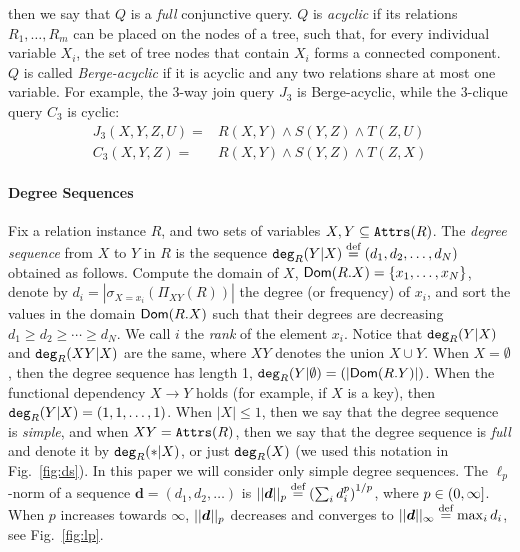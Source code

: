 then we say that $Q$ is a \emph{full} conjunctive
query.  $Q$ is \emph{acyclic} if its relations $R_1, \ldots, R_m$ can
be placed on the nodes of a tree, such that, for every individual
variable $X_i$, the set of tree nodes that contain $X_i$ forms a
connected component.  $Q$ is called \emph{Berge-acyclic} if it is
acyclic and any two relations share at most one variable.  For
example, the 3-way join query $J_3$ is Berge-acyclic, while the
3-clique query $C_3$ is cyclic:
%
\begin{align}
  J_3(X,Y,Z,U) = & R(X,Y) \wedge S(Y,Z) \wedge T(Z, U) \label{eq:j3}\\
  C_3(X,Y,Z)   = & R(X,Y) \wedge S(Y,Z) \wedge T(Z,X) \label{eq:c3}
\end{align}
%

\paragraph{Degree Sequences}
Fix a relation instance $R$, and two
sets of variables $X, Y \subseteq \texttt{Attrs}(R)$.  The \emph{degree
  sequence} from $X$ to $Y$ in $R$ is the sequence
$\texttt{deg}_R(Y|X) \stackrel{\text{def}}{=} (d_1, d_2, \ldots, d_N)$ obtained as follows.
Compute the domain of $X$, $\textsf{Dom}(R.X)=\{x_1, \ldots, x_N\}$, denote
by $d_i = |\sigma_{X=x_i}(\Pi_{XY}(R))|$ the degree (or frequency) of
$x_i$, and sort the values in the domain $\textsf{Dom}(R.X)$ such that their
degrees are decreasing $d_1 \geq d_2 \geq \cdots \geq d_N$.  We call
$i$ the \emph{rank} of the element $x_i$.  Notice that
$\texttt{deg}_R(Y|X)$ and $\texttt{deg}_R(XY|X)$ are the same, where $XY$
denotes the union $X \cup Y$.  When $X=\emptyset$, then the degree
sequence has length 1, $\texttt{deg}_R(Y|\emptyset)=(|\textsf{Dom}(R.Y)|)$.  When
the functional dependency $X \rightarrow Y$ holds (for example, if $X$
is a key), then $\texttt{deg}_R(Y|X)=(1,1,\ldots,1)$.  When $|X|\leq 1$, then
we say that the degree sequence is \emph{simple}, and when
$XY =\texttt{Attrs}(R)$, then we say that the degree sequence is \emph{full}
and denote it by $\texttt{deg}_R(*|X)$, or just $\texttt{deg}_R(X)$ (we used
this notation in Fig.~\ref{fig:ds}).  In this paper we will consider
only simple degree sequences.
%
%
%
The $\ell_p$-norm of a sequence $\bm d = (d_1, d_2, \ldots)$ is
$||\bm d||_p \stackrel{\text{def}}{=} \left(\sum_i d_i^p\right)^{1/p}$, where
$p \in (0,\infty]$.  When $p$ increases towards $\infty$,
$||\bm d||_p$ decreases and converges to
$||\bm d||_\infty \stackrel{\text{def}}{=} \max_i d_i$, see Fig.~\ref{fig:lp}.

